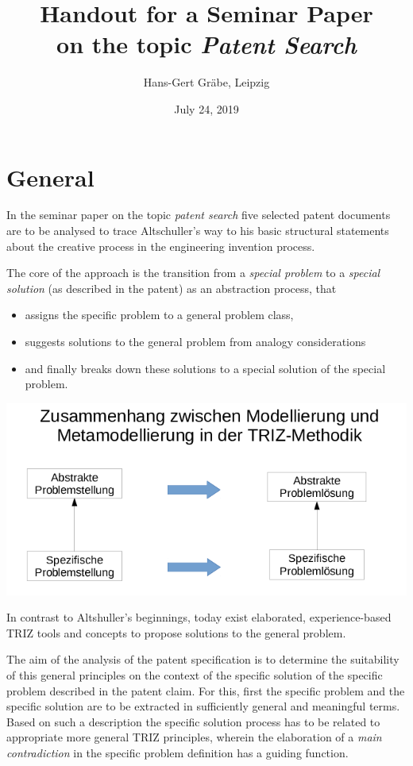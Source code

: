 \documentclass[11pt,a4paper]{article}
\title{Handout for a Seminar Paper \\[4pt] on the topic \emph{Patent Search}}
\author{Hans-Gert Gr\"abe, Leipzig}
\date{July 24, 2019}
\begin{document}
\maketitle

\section{General}

In the seminar paper on the topic \emph{patent search} five selected patent
documents are to be analysed to trace Altschuller's way to his basic
structural statements about the creative process in the engineering invention
process.

The core of the approach is the transition from a \emph{special problem} to a
\emph{special solution} (as described in the patent) as an abstraction
process, that
\begin{itemize}
\item assigns the specific problem to a general problem class,
\item suggests solutions to the general problem from analogy considerations   
\item and finally breaks down these solutions to a special solution of the
  special problem.
\end{itemize}
\begin{center}
  \includegraphics[width=.7\textwidth]{2019-04-25/Folie-1.png}
\end{center}
In contrast to Altshuller's beginnings, today exist elaborated,
experience-based TRIZ tools and concepts to propose solutions to the general
problem.

The aim of the analysis of the patent specification is to determine the
suitability of this general principles on the context of the specific solution
of the specific problem described in the patent claim. For this, first the
specific problem and the specific solution are to be extracted in sufficiently
general and meaningful terms.  Based on such a description the specific
solution process has to be related to appropriate more general TRIZ
principles, wherein the elaboration of a \emph{main contradiction} in the
specific problem definition has a guiding function.
\end{document}
